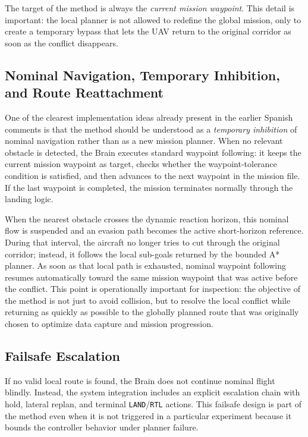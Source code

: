 \documentclass[a4paper,11pt]{article}
\begin{document}
The target of the method is always the \emph{current mission waypoint}. This detail is important: the local planner is not allowed to redefine the global mission, only to create a temporary bypass that lets the UAV return to the original corridor as soon as the conflict disappears.

\subsection{Nominal Navigation, Temporary Inhibition, and Route Reattachment}

One of the clearest implementation ideas already present in the earlier Spanish comments is that the method should be understood as a \emph{temporary inhibition} of nominal navigation rather than as a new mission planner. When no relevant obstacle is detected, the Brain executes standard waypoint following: it keeps the current mission waypoint as target, checks whether the waypoint-tolerance condition is satisfied, and then advances to the next waypoint in the mission file. If the last waypoint is completed, the mission terminates normally through the landing logic.

When the nearest obstacle crosses the dynamic reaction horizon, this nominal flow is suspended and an evasion path becomes the active short-horizon reference. During that interval, the aircraft no longer tries to cut through the original corridor; instead, it follows the local sub-goals returned by the bounded A* planner. As soon as that local path is exhausted, nominal waypoint following resumes automatically toward the same mission waypoint that was active before the conflict. This point is operationally important for inspection: the objective of the method is not just to avoid collision, but to resolve the local conflict while returning as quickly as possible to the globally planned route that was originally chosen to optimize data capture and mission progression.

\subsection{Failsafe Escalation}

If no valid local route is found, the Brain does not continue nominal flight blindly. Instead, the system integration includes an explicit escalation chain with hold, lateral replan, and terminal \texttt{LAND}/\texttt{RTL} actions. This failsafe design is part of the method even when it is not triggered in a particular experiment because it bounds the controller behavior under planner failure.
\end{document}
